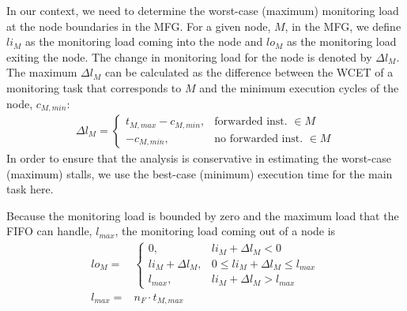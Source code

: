 
In our context, we need to determine the worst-case (maximum) monitoring load
at the node boundaries in the MFG. 
For a given node, $M$, in the MFG, we define $li_{M}$ as the monitoring load
coming into the node and $lo_{M}$ as the monitoring load exiting the node. The
change in monitoring load for the node is denoted by $\Delta l_{M}$. The maximum
$\Delta l_{M}$ can be calculated as the difference between the WCET of a monitoring
task that corresponds to $M$ and the minimum execution cycles of the node,
$c_{M,min}$: 
\begin{align*}
\Delta l_{M} = 
	\begin{cases}
	t_{M,max} - c_{M,min}, &\text{forwarded inst. } \in M \\
	- c_{M,min}, &\text{no forwarded inst. } \in M
	\end{cases}
\end{align*}
In order to ensure that the analysis is conservative in estimating the worst-case 
(maximum) stalls, we use 
the best-case (minimum) execution time for the main task here. 


Because the monitoring load is bounded by zero and the maximum load that
the FIFO can handle, $l_{max}$, the monitoring load coming out of a node is
\begin{align*}
	lo_{M} =& 
		\begin{cases}
			0, &li_{M} + \Delta l_{M} < 0 \\
			li_{M} + \Delta l_{M}, &0 \leq li_{M} + \Delta l_{M} \leq l_{max} \\
			l_{max}, &li_{M} + \Delta l_{M} > l_{max}
		\end{cases} \\
  l_{max} =& n_F \cdot t_{M,max}
\end{align*}

